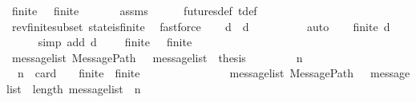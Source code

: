 \begin{isabellebody}
\ {\isachardoublequoteopen}finite\ {\isasymsigma}\ {\isasymand}\ finite\ {\isasymsigma}{\isacharprime}{\isachardoublequoteclose}\isanewline
\ \ \ \ \isamarkupfalse%
\ assms{\isacharparenleft}{}{\isacharparenright}\isanewline
\ \ \ \ \isamarkupfalse%
\ futures{\isacharunderscore}def\ {\isasymSigma}t{\isacharunderscore}def\isanewline
\ \ \ \ \isamarkupfalse%
\ rev{\isacharunderscore}finite{\isacharunderscore}subset\ state{\isacharunderscore}is{\isacharunderscore}finite\ \isamarkupfalse%
\ fastforce\isanewline
\ \ \isamarkupfalse%
\ d\ \ {\isachardoublequoteopen}d\ {\isacharequal}\ {\isasymsigma}{\isacharprime}\ {\isacharminus}\ {\isasymsigma}{\isachardoublequoteclose}\isanewline
\ \ \ \ \isamarkupfalse%
\ auto\isanewline
\ \ \isamarkupfalse%
\ {\isachardoublequoteopen}finite\ d{\isachardoublequoteclose}\isanewline
\ \ \ \ \isamarkupfalse%
\ {\isacharparenleft}simp\ add{\isacharcolon}\ {\isacartoucheopen}d\ {\isacharequal}\ {\isasymsigma}{\isacharprime}\ {\isacharminus}\ {\isasymsigma}{\isacartoucheclose}\ {\isacartoucheopen}finite\ {\isasymsigma}\ {\isasymand}\ finite\ {\isasymsigma}{\isacharprime}{\isacartoucheclose}{\isacharparenright}\isanewline
\isanewline
\ \ \isamarkupfalse%
\ {\isachardoublequoteopen}{\isasymAnd}message{\isacharunderscore}list{\isachardot}\ MessagePath\ {\isasymsigma}\ {\isasymsigma}{\isacharprime}\ message{\isacharunderscore}list\ {\isasymLongrightarrow}\ thesis{\isachardoublequoteclose}\isanewline
\isanewline
\ \ \isacommand{{\isacharbraceleft}}\isamarkupfalse%
\isanewline
\ \ \ \ \isamarkupfalse%
\ n\isanewline
\ \ \ \ \isamarkupfalse%
\ {\isachardoublequoteopen}{\isasymlbrakk}\ n\ {\isacharequal}\ card\ {\isacharparenleft}{\isasymsigma}{\isacharprime}\ {\isacharminus}\ {\isasymsigma}{\isacharparenright}{\isacharsemicolon}\ finite\ {\isasymsigma}{\isacharsemicolon}\ finite\ {\isasymsigma}{\isacharprime}{\isacharsemicolon}\ {\isasymsigma}\ {\isasymnoteq}\ {\isasymsigma}{\isacharprime}{\isacharsemicolon}\ {\isasymsigma}\ {\isasymin}\ {\isasymSigma}{\isacharsemicolon}\ {\isasymsigma}{\isacharprime}\ {\isasymin}\ {\isasymSigma}{\isacharsemicolon}\ {\isasymsigma}\ {\isasymsubseteq}\ {\isasymsigma}{\isacharprime}\ {\isasymrbrakk}\ {\isasymLongrightarrow}\ {\isasymexists}message{\isacharunderscore}list{\isachardot}\ MessagePath\ {\isasymsigma}\ {\isasymsigma}{\isacharprime}\ message{\isacharunderscore}list\ {\isasymand}\ length\ message{\isacharunderscore}list\ {\isacharequal}\ n{\isachardoublequoteclose}\isanewline

\end{isabellebody}
